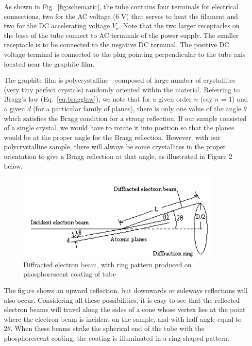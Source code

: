 As shown in Fig.~\ref{fig:schematic}, the tube contains four terminals for electrical
connections, two for the AC voltage (6 V) that serves to heat the
filament and two for the DC accelerating voltage $V_a$.
 Note that the two larger receptacles on the base of the tube connect
to AC terminals of the power supply.  The smaller receptacle is to be
connected to the negative DC terminal.  The positive DC voltage
terminal is connected to the plug pointing perpendicular to the tube
axis located near the graphite film.

The graphite film is polycrystalline---composed of large number of crystallites
(very tiny perfect crystals) randomly oriented within the material.  Referring
to Bragg's law (Eq.~\ref{eq:bragglaw}), we note that for a given order $n$ (say
$n$ = 1) and a given $d$ (for a particular family of planes), there is only one
value of the angle ${\theta}$ which satisfies the Bragg condition for a strong
reflection.  If our sample consisted of a single crystal, we would have to
rotate it into position so that the planes would be at the proper angle for the
Bragg reflection.  However, with our polycrystalline sample, there will always
be some crystallites in the proper orientation to give a Bragg reflection at
that angle, as illustrated in Figure 2 below.
\begin{figure}
\begin{centering}
\includegraphics[width=4in]{../images/ediffraction-img2.png}
\caption{Diffracted electron beam, with ring pattern produced on phosphorescent coating of tube}
\label{fig:rings}
\end{centering}
\end{figure}

The figure shows an upward reflection, but downwards or sideways
reflections will also occur. Considering all these possibilities, it is
easy to see that the reflected electron beams will travel along the
sides of a cone whose vertex lies at the point where the electron beam
is incident on the sample, and with half-angle equal to $2{\theta}$.
 When these beams strike the spherical end of the tube with the
phosphorescent coating, the coating is illuminated in a ring-shaped
pattern.

